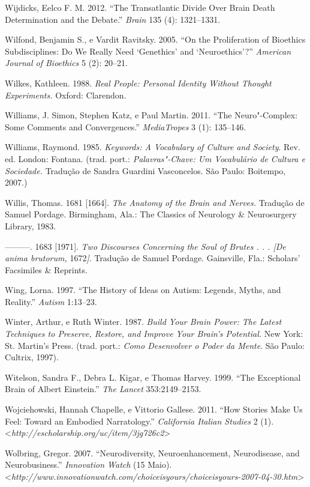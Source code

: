 Wijdicks, Eelco F. M. 2012. ``The Transatlantic Divide Over Brain Death
Determination and the Debate.'' \emph{Brain} 135 (4): 1321--1331.

Wilfond, Benjamin S., e Vardit Ravitsky. 2005. ``On the Proliferation of
Bioethics Subdisciplines: Do We Really Need `Genethics' and
`Neuroethics'?'' \emph{American Journal of Bioethics} 5 (2): 20--21.

Wilkes, Kathleen. 1988. \emph{Real People: Personal Identity Without
Thought Experiments.} Oxford: Clarendon.

Williams, J. Simon, Stephen Katz, e Paul Martin. 2011. ``The
Neuro"-Complex: Some Comments and Convergences.'' \emph{MediaTropes} 3
(1): 135--146.

Williams, Raymond. 1985. \emph{Keywords: A Vocabulary of Culture and
Society}. Rev. ed. London: Fontana. (trad. port.: \emph{Palavras"-Chave:
Um Vocabulário de Cultura e Sociedade.} Tradução de Sandra Guardini
Vasconcelos. São Paulo: Boitempo, 2007.)

Willis, Thomas. 1681 {[}1664{]}. \emph{The Anatomy of the Brain and
Nerves.} Tradução de Samuel Pordage. Birmingham, Ala.: The Classics of
Neurology \& Neurosurgery Library, 1983.

---------. 1683 {[}1971{]}. \emph{Two Discourses Concerning the Soul of
Brutes . . . {[}De anima brutorum,} 1672\emph{{]}}. Tradução de Samuel
Pordage. Gainsville, Fla.: Scholars' Facsimiles \& Reprints.

Wing, Lorna. 1997. ``The History of Ideas on Autism: Legends, Myths, and
Reality.'' \emph{Autism} 1:13--23.

Winter, Arthur, e Ruth Winter. 1987. \emph{Build Your Brain Power: The
Latest Techniques to Preserve, Restore, and Improve Your Brain's
Potential.} New York: St. Martin's Press. (trad. port.: \emph{Como
Desenvolver o Poder da Mente}. São Paulo: Cultrix, 1997).

Witelson, Sandra F., Debra L. Kigar, e Thomas Harvey. 1999. ``The
Exceptional Brain of Albert Einstein.'' \emph{The Lancet}
353:2149--2153.

Wojciehowski, Hannah Chapelle, e Vittorio Gallese. 2011. ``How Stories
Make Us Feel: Toward an Embodied Narratology.'' \emph{California Italian
Studies} 2 (1). \textless{}\emph{http://escholarship.org/uc/item/3jg726c2}\textgreater{}

Wolbring, Gregor. 2007. ``Neurodiversity, Neuroenhancement,
Neurodisease, and Neurobusiness.'' \emph{Innovation Watch} (15 Maio).
\textless{}\emph{http://www.innovationwatch.com/choiceisyours/choiceisyours-2007-04-30.htm}\textgreater{}

